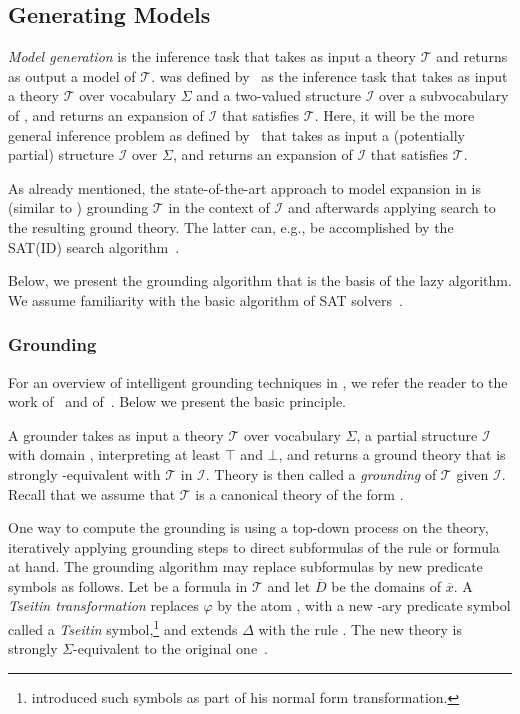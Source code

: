 \documentclass[11pt]{article}
\newcommand{\m}[1]{\ensuremath{#1}\xspace}
\newcommand{\true}{\m{\top}}
\newcommand{\false}{\m{\bot}}
\newcommand{\voc}{\m{\Sigma}}
\newcommand{\I}{\m{\mathcal{I}}}
\newcommand{\theory}{\m{\mathcal{T}}}
\newcommand{\D}{\m{\Delta}}
\newcommand{\f}{\m{\varphi}}
\newcommand{\xxx}{\m{\overline{x}}}
\newcommand{\DDD}{\m{\overline{D}}}
\newcommand{\logicname}[1]{\text{\sc #1}\xspace}
\newcommand{\foid}{\logicname{FO(\ensuremath{ID})}}
\theoremstyle{plain}
\theoremstyle{definition}
\theoremstyle{example_basic}
\theoremstyle{example_contd}
\theoremstyle{plain}
\newcommand{\change}[1]{#1}
\begin{document}
\subsection{Generating Models}
\emph{Model generation} is the inference task that takes as input a theory \theory and returns as output a model of \theory. \MX was defined by~ as the inference task that takes as input a theory \theory over vocabulary \voc and a two-valued structure \I over a subvocabulary of , and returns an expansion \M of \I that satisfies \theory. Here, it will be the more general inference problem as defined by~ that takes as input a (potentially partial) structure \I over \voc, and returns an expansion \M of \I that satisfies \theory.

As already mentioned, the state-of-the-art approach to model expansion in \foid is (similar to \ASP) grounding \theory in the context of \I and afterwards applying search to the resulting ground theory. The latter can, e.g., be accomplished by the SAT(ID) search algorithm~.

Below, we present the grounding algorithm that is the basis of the lazy \MX algorithm.
We assume familiarity with the basic \CDCL algorithm of SAT solvers~\cite{faia/SilvaLM09}.


\subsubsection{Grounding}
For an overview of intelligent grounding techniques in \foid, we refer the reader to the work of~ and of~. Below we present the basic principle.

A grounder takes as input a theory \theory over vocabulary \voc, a partial structure \I with domain , interpreting at least \true and \false, and returns a ground theory  that is strongly -equivalent with \theory in \I.  Theory  is then called a \emph{grounding} of \theory given \I. Recall that we assume that  \theory is a canonical theory of the form . 

One way to compute the  grounding is using a top-down process on the theory,
iteratively applying grounding steps to direct subformulas of the rule or formula at hand. The grounding algorithm may replace subformulas by new predicate symbols as follows. Let  be a formula in \theory and let \DDD be the domains of \xxx. A \emph{Tseitin transformation} replaces \f by the atom , with  a new -ary predicate symbol called a \emph{Tseitin} symbol,\footnote{\change{ introduced such symbols as part of his normal form transformation.}} and extends \D with the rule . The new theory is strongly \voc-equivalent to the original one~.
\end{document}
